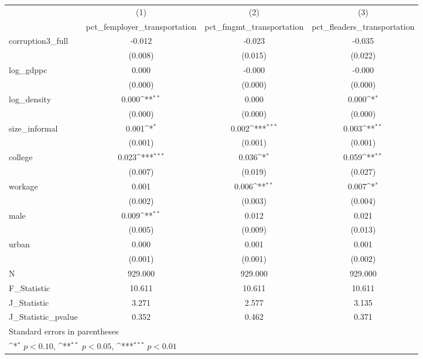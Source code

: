 {
\def\sym#1{\ifmmode^{#1}\else\(^{#1}\)\fi}
\begin{tabular}{l*{3}{c}}
\hline\hline
            &\multicolumn{1}{c}{(1)}&\multicolumn{1}{c}{(2)}&\multicolumn{1}{c}{(3)}\\
            &\multicolumn{1}{c}{pct\_femployer\_transportation}&\multicolumn{1}{c}{pct\_fmgmt\_transportation}&\multicolumn{1}{c}{pct\_fleaders\_transportation}\\
\hline
corruption3\_full&      -0.012         &      -0.023         &      -0.035         \\
            &     (0.008)         &     (0.015)         &     (0.022)         \\
[1em]
log\_gdppc   &       0.000         &      -0.000         &      -0.000         \\
            &     (0.000)         &     (0.000)         &     (0.000)         \\
[1em]
log\_density &       0.000\sym{**} &       0.000         &       0.000\sym{*}  \\
            &     (0.000)         &     (0.000)         &     (0.000)         \\
[1em]
size\_informal&       0.001\sym{*}  &       0.002\sym{***}&       0.003\sym{**} \\
            &     (0.001)         &     (0.001)         &     (0.001)         \\
[1em]
college     &       0.023\sym{***}&       0.036\sym{*}  &       0.059\sym{**} \\
            &     (0.007)         &     (0.019)         &     (0.027)         \\
[1em]
workage     &       0.001         &       0.006\sym{**} &       0.007\sym{*}  \\
            &     (0.002)         &     (0.003)         &     (0.004)         \\
[1em]
male        &       0.009\sym{**} &       0.012         &       0.021         \\
            &     (0.005)         &     (0.009)         &     (0.013)         \\
[1em]
urban       &       0.000         &       0.001         &       0.001         \\
            &     (0.001)         &     (0.001)         &     (0.002)         \\
\hline
N           &     929.000         &     929.000         &     929.000         \\
F\_Statistic &      10.611         &      10.611         &      10.611         \\
J\_Statistic &       3.271         &       2.577         &       3.135         \\
J\_Statistic\_pvalue&       0.352         &       0.462         &       0.371         \\
\hline\hline
\multicolumn{4}{l}{\footnotesize Standard errors in parentheses}\\
\multicolumn{4}{l}{\footnotesize \sym{*} \(p<0.10\), \sym{**} \(p<0.05\), \sym{***} \(p<0.01\)}\\
\end{tabular}
}
